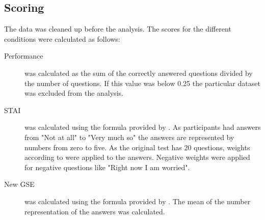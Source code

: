 \subsection{Scoring}
The data was cleaned up before the analysis.
The scores for the different conditions were calculated as follows:
\begin{description}
  \item[Performance] was calculated as the sum of the correctly answered questions divided by the number of questions. If this value was below 0.25 the particular dataset was excluded from the analysis.
  \item[STAI] was calculated using the formula provided by \textcite{marteauDevelopmentSixitemShortform1992}. As participants had answers from "Not at all" to "Very much so" the answers are represented by numbers from zero to five. As the original test has 20 questions, weights according to \textcite{marteauDevelopmentSixitemShortform1992} were applied to the answers. Negative weights were applied for negative questions like "Right now I am worried".
  \item[New GSE] was calculated using the formula provided by \textcite{guayAssessmentSituationalIntrinsic2000}. The mean of the number representation of the answers was calculated.
\end{description}